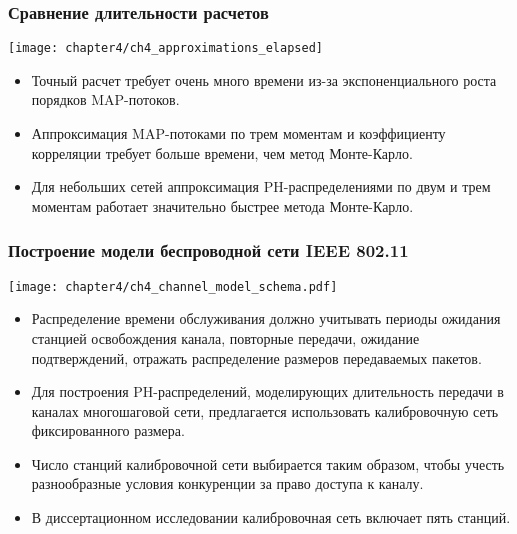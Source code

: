 \begin{frame}
    \frametitle{Сравнение длительности расчетов}
    \begin{center}
        \texttt{[image: chapter4/ch4\_approximations\_elapsed]}
    \end{center}
    \footnotesize
    \begin{itemize}
        \item Точный расчет требует очень много времени из-за экспоненциального роста порядков MAP-потоков.
        \item Аппроксимация MAP-потоками по трем моментам и коэффициенту корреляции требует больше времени, чем метод Монте-Карло.
        \item Для небольших сетей аппроксимация PH-распределениями по двум и трем моментам работает значительно быстрее метода Монте-Карло.
    \end{itemize}
\end{frame}

\begin{frame}
    \frametitle{Построение модели беспроводной сети IEEE 802.11}
    \begin{center}
        \texttt{[image: chapter4/ch4\_channel\_model\_schema.pdf]}
    \end{center}
    \footnotesize
    \begin{itemize}
        \item Распределение времени обслуживания должно учитывать периоды ожидания станцией освобождения канала, повторные передачи, ожидание подтверждений, отражать распределение размеров передаваемых пакетов.
        \item Для построения PH-распределений, моделирующих длительность передачи в каналах многошаговой сети, предлагается использовать калибровочную сеть фиксированного размера.
        \item Число станций калибровочной сети выбирается таким образом, чтобы учесть разнообразные условия конкуренции за право доступа к каналу.
        \item В диссертационном исследовании калибровочная сеть включает пять станций.
    \end{itemize}
\end{frame}

